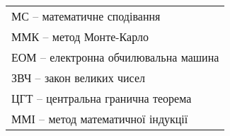 
\begin{tabular}{l}
	МС -- математичне сподівання \\
	ММК -- метод Монте-Карло \\
	ЕОМ -- електронна обчилювальна машина \\
	ЗВЧ -- закон великих чисел \\
	ЦГТ -- центральна гранична теорема \\
	ММІ -- метод математичної індукції
\end{tabular}